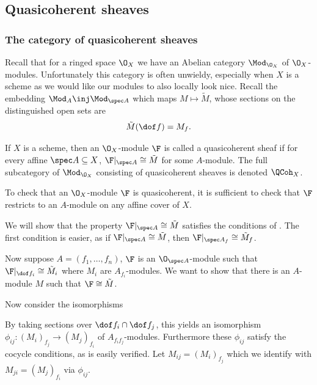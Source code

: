 \subsection{Quasicoherent sheaves}

\subsubsection{The category of quasicoherent sheaves}

Recall that for a ringed space $\O_X$ we have an Abelian category $\Mod_{\O_X}$ of $\O_X$-modules.
Unfortunately this category is often unwieldy, especially when $X$ is a scheme as we would like our modules to also locally look nice.
Recall the embedding $\Mod_A\inj\Mod_{\spec A}$ which maps $M\mapsto\tilde M$, whose sections on the distinguished open sets are
$$ \tilde M(\dof f) = M_f . $$

\bdefn

    If $X$ is a scheme, then an $\O_X$-module $\F$ is called a {\emphcolor quasicoherent sheaf} if for every affine $\spec A\subseteq X$,
    $\F|_{\spec A}\cong\tilde M$ for some $A$-module.
    The full subcategory of $\Mod_{\O_X}$ consisting of quasicoherent sheaves is denoted $\QCoh_X$.

\edefn

\bthrm

    To check that an $\O_X$-module $\F$ is quasicoherent, it is sufficient to check that $\F$ restricts to an $A$-module on any affine cover of $X$.

\ethrm

\bproof

    We will show that the property $\F|_{\spec A}\cong\tilde M$ satisfies the conditions of .
    The first condition is easier, as if $\F|_{\spec A}\cong\tilde M$, then $\F|_{\spec A_f}\cong\tilde M_f$.

    Now suppose $A=(f_1,\dots,f_n)$, $\F$ is an $\O_{\spec A}$-module such that $\F|_{\dof f_i}\cong\tilde M_i$ where $M_i$ are $A_{f_i}$-modules.
    We want to show that there is an $A$-module $M$ such that $\F\cong\tilde M$.

    Now consider the isomorphisms

    By taking sections over $\dof f_i\cap\dof f_j$, this yields an isomorphism $\phi_{ij}\colon(M_i)_{f_j}\to(M_j)_{f_i}$ of $A_{f_if_j}$-modules.
    Furthermore these $\phi_{ij}$ satisfy the cocycle conditions, as is easily verified.
    Let $M_{ij}=(M_i)_{f_j}$ which we identify with $M_{ji}=(M_j)_{f_i}$ via $\phi_{ij}$.

